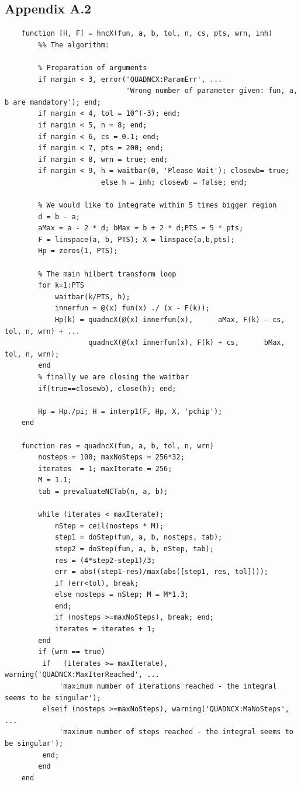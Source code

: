 \documentclass[12pt,twoside,a4paper]{article}
\numberwithin{equation}{subsection}
\numberwithin{figure}{subsection}
\begin{document}
\subsection*{Appendix A.2}
\begin{lstlisting}
	function [H, F] = hncX(fun, a, b, tol, n, cs, pts, wrn, inh)    
	    %% The algorithm:
	    
	    % Preparation of arguments
	    if nargin < 3, error('QUADNCX:ParamErr', ...
	                         'Wrong number of parameter given: fun, a, b are mandatory'); end;
	    if nargin < 4, tol = 10^(-3); end;
	    if nargin < 5, n = 8; end;
	    if nargin < 6, cs = 0.1; end;
	    if nargin < 7, pts = 200; end;
	    if nargin < 8, wrn = true; end;
	    if nargin < 9, h = waitbar(0, 'Please Wait'); closewb= true; 
	                   else h = inh; closewb = false; end;
	    
	    % We would like to integrate within 5 times bigger region
	    d = b - a;
	    aMax = a - 2 * d; bMax = b + 2 * d;PTS = 5 * pts;
	    F = linspace(a, b, PTS); X = linspace(a,b,pts);
	    Hp = zeros(1, PTS);
	    
	    % The main hilbert transform loop
	    for k=1:PTS
	        waitbar(k/PTS, h);
	        innerfun = @(x) fun(x) ./ (x - F(k));
	        Hp(k) = quadncX(@(x) innerfun(x),      aMax, F(k) - cs, tol, n, wrn) + ...
	                quadncX(@(x) innerfun(x), F(k) + cs,      bMax, tol, n, wrn);
	    end
	    % finally we are closing the waitbar
	    if(true==closewb), close(h); end;
	    
	    Hp = Hp./pi; H = interp1(F, Hp, X, 'pchip');
	end
	
	function res = quadncX(fun, a, b, tol, n, wrn)    
	    nosteps = 100; maxNoSteps = 256*32;
	    iterates  = 1; maxIterate = 256;
	    M = 1.1;
	    tab = prevaluateNCTab(n, a, b);
	    
	    while (iterates < maxIterate);
	        nStep = ceil(nosteps * M);
	        step1 = doStep(fun, a, b, nosteps, tab);
	        step2 = doStep(fun, a, b, nStep, tab);
	        res = (4*step2-step1)/3; 
	        err = abs((step1-res)/max(abs([step1, res, tol])));
	        if (err<tol), break;
	        else nosteps = nStep; M = M*1.3;
	        end;
	        if (nosteps >=maxNoSteps), break; end;
	        iterates = iterates + 1;
	    end
	    if (wrn == true)
	     if   (iterates >= maxIterate), warning('QUADNCX:MaxIterReached', ...
	         'maximum number of iterations reached - the integral seems to be singular'); 
         elseif (nosteps >=maxNoSteps), warning('QUADNCX:MaNoSteps', ...
             'maximum number of steps reached - the integral seems to be singular'); 
         end; 
        end
	end
	

\end{lstlisting}
\end{document}
